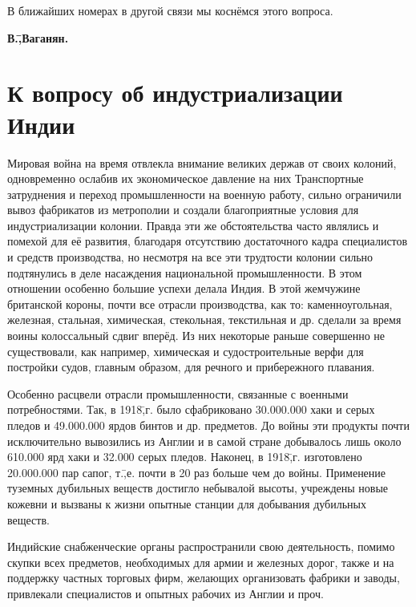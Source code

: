 В ближайших номерах в другой связи мы коснёмся этого вопроса.

\begin{flushright}
 \textbf{В.\=,Ваганян.}\hspace*{2em}
\end{flushright}

\section*{К вопросу об индустриализации Индии}
\label{sec:8}

Мировая война на время отвлекла внимание великих держав от своих колоний, одновременно ослабив их экономическое давление на них Транспортные затруднения и переход промышленности на военную работу, сильно ограничили вывоз фабрикатов из метрополии и создали благоприятные условия для индустриализации колонии. Правда эти же обстоятельства часто являлись и помехой для её развития, благодаря отсутствию достаточного кадра специалистов и средств производства, но несмотря на все эти трудтости колонии сильно подтянулись в деле насаждения национальной промышленности. В этом отношении особенно большие успехи делала Индия. В этой жемчужине британской короны, почти все отрасли производства, как то: каменноугольная, железная, стальная, химическая, стекольная, текстильная и др. сделали за время воины колоссальный сдвиг вперёд. Из них некоторые раньше совершенно не существовали, как например, химическая и судостроительные верфи для постройки судов, главным образом, для речного и прибережного плавания.

Особенно расцвели отрасли промышленности, связанные с военными потребностями. Так, в 1918\=,г. было сфабриковано 30.000.000 хаки и серых пледов и 49.000.000 ярдов бинтов и др. предметов. До войны эти продукты почти исключительно вывозились из Англии и в самой стране добывалось лишь около 610.000 ярд хаки и 32.000 серых пледов. Наконец, в 1918\=,г. изготовлено 20.000.000 пар сапог, т.\=,е. почти в 20 раз больше чем до войны. Применение туземных дубильных веществ достигло небывалой высоты, учреждены новые кожевни и вызваны к жизни опытные станции для добывания дубильных веществ.

Индийские снабженческие органы распространили свою деятельность, помимо скупки всех предметов, необходимых для армии и железных дорог, также и на поддержку частных торговых фирм, желающих организовать фабрики и заводы, привлекали специалистов и опытных рабочих из Англии и проч.

